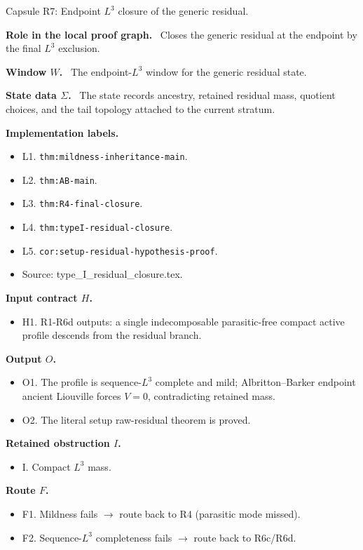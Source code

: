 \documentclass[11pt]{amsart}
\newcommand{\capsulefield}[1]{\par\smallskip\noindent\textbf{#1.}\ }
\begin{document}
\begin{proofcapsule}{Capsule R7: Endpoint $L^3$ closure of the generic residual.}
  \capsulefield{Role in the local proof graph}
  Closes the generic residual at the endpoint by the final \(L^3\) exclusion.

  \capsulefield{Window \(W\)}
The endpoint-$L^3$ window for the generic residual state.

  \capsulefield{State data \(\Sigma\)}
The state records ancestry, retained residual mass, quotient choices, and the tail topology attached to the current stratum.

  \capsulefield{Implementation labels}
  \begin{itemize}[leftmargin=1.8em]
  \item L1. \texttt{thm:mildness-inheritance-main}.
  \item L2. \texttt{thm:AB-main}.
  \item L3. \texttt{thm:R4-final-closure}.
  \item L4. \texttt{thm:typeI-residual-closure}.
  \item L5. \texttt{cor:setup-residual-hypothesis-proof}.
  \item Source: type\_I\_residual\_closure.tex.
  \end{itemize}

  \capsulefield{Input contract \(H\)}
  \begin{itemize}[leftmargin=1.8em]
  \item H1. R1-R6d outputs: a single indecomposable parasitic-free compact active profile descends from the residual branch.
  \end{itemize}

  \capsulefield{Output \(O\)}
  \begin{itemize}[leftmargin=1.8em]
  \item O1. The profile is sequence-\(L^3\) complete and mild; Albritton--Barker endpoint ancient Liouville forces \(V=0\), contradicting retained mass.
  \item O2. The literal setup raw-residual theorem is proved.
  \end{itemize}

  \capsulefield{Retained obstruction \(I\)}
  \begin{itemize}[leftmargin=1.8em]
  \item I. Compact $L^3$ mass.
  \end{itemize}

  \capsulefield{Route \(F\)}
  \begin{itemize}[leftmargin=1.8em]
  \item F1. Mildness fails $\to$ route back to R4 (parasitic mode missed).
  \item F2. Sequence-$L^3$ completeness fails $\to$ route back to R6c/R6d.
  \end{itemize}


\end{proofcapsule}
\end{document}
